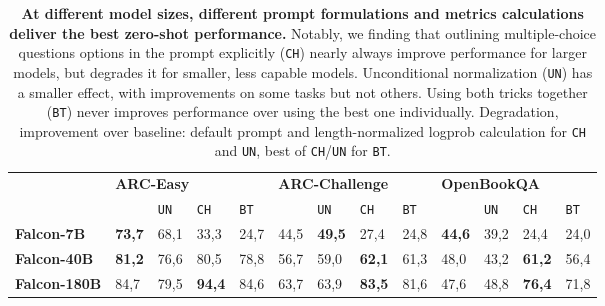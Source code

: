 \documentclass{article}
\DeclareRobustCommand{\performance}[1]{\textcolor{JungleGreen}{#1}}
\begin{document}
\begin{table}[t]
\caption{\performance{\textbf{At different model sizes, different prompt formulations and metrics calculations deliver the best zero-shot performance.}} Notably, we finding that outlining multiple-choice questions options in the prompt explicitly (\texttt{CH}) nearly always improve performance for larger models, but degrades it for smaller, less capable models. Unconditional normalization (\texttt{UN}) has a smaller effect, with improvements on some tasks but not others. Using both tricks together (\texttt{BT}) never improves performance over using the best one individually. {\color{Bittersweet} Degradation}, {{\color{ForestGreen}improvement}} over baseline: \citet{eval-harness} default prompt and length-normalized logprob calculation for \texttt{CH} and \texttt{UN}, best of \texttt{CH}/\texttt{UN} for \texttt{BT}.}
\vspace{0.1in}
\centering
\label{tab:evals_mess}
\begin{small}
\begin{tabular}{lllllllllllll}
\toprule
                     & \multicolumn{4}{l}{\textbf{ARC-Easy}}                      & \multicolumn{4}{l}{\textbf{ARC-Challenge}}       & \multicolumn{4}{l}{\textbf{OpenBookQA}}          \\
                     &                   & \texttt{UN}   & \texttt{CH}      & \texttt{BT}         &                        & \texttt{UN}        & \texttt{CH}      & \texttt{BT}    &                     & \texttt{UN}        & \texttt{CH}      & \texttt{BT}   \\ \midrule
\textbf{Falcon-7B}   & \textbf{73,7}    & \color{Bittersweet} 68,1     & \color{Bittersweet} 33,3          & \color{Bittersweet} 24,7          & \multicolumn{1}{|l}{44,5}                  & \color{ForestGreen} \textbf{49,5} & \color{Bittersweet} 27,4          & \color{Bittersweet} 24,8     & \multicolumn{1}{|l}{\textbf{44,6}}       & \color{Bittersweet} 39,2      & \color{Bittersweet} 24,4          & \color{Bittersweet} 24,0      \\
\textbf{Falcon-40B}  & \textbf{81,2}    & \color{Bittersweet} 76,6     & \color{Bittersweet} 80,5          & \color{Bittersweet} 78,8          & \multicolumn{1}{|l}{56,7}                  & \color{ForestGreen} 59,0          & \color{ForestGreen} \textbf{62,1} & \color{Bittersweet} 61,3     & \multicolumn{1}{|l}{48,0}                & \color{Bittersweet} 43,2      & \color{ForestGreen} \textbf{61,2} & \color{Bittersweet} 56,4      \\
\textbf{Falcon-180B} & 84,7             & \color{Bittersweet} 79,5     & \color{ForestGreen} \textbf{94,4} & \color{Bittersweet} 84,6  & \multicolumn{1}{|l}{63,7}                  & \color{ForestGreen} 63,9          & \color{ForestGreen} \textbf{83,5} & \color{Bittersweet} 81,6     & \multicolumn{1}{|l}{47,6}               & \color{ForestGreen} 48,8      & \color{ForestGreen} \textbf{76,4} & \color{Bittersweet} 71,8     \\
\bottomrule
\end{tabular}
\end{small}
\vspace{-0.1in}
\end{table}
\end{document}

